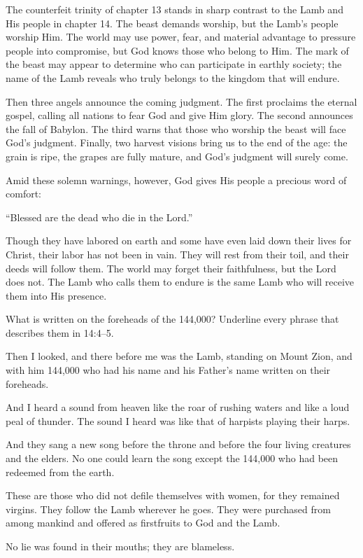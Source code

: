 The counterfeit trinity of chapter 13 stands in sharp contrast to the Lamb and His people in chapter 14. The beast demands worship, but the Lamb's people worship Him. The world may use power, fear, and material advantage to pressure people into compromise, but God knows those who belong to Him. The mark of the beast may appear to determine who can participate in earthly society; the name of the Lamb reveals who truly belongs to the kingdom that will endure.

Then three angels announce the coming judgment. The first proclaims the eternal gospel, calling all nations to fear God and give Him glory. The second announces the fall of Babylon. The third warns that those who worship the beast will face God's judgment. Finally, two harvest visions bring us to the end of the age: the grain is ripe, the grapes are fully mature, and God's judgment will surely come.

Amid these solemn warnings, however, God gives His people a precious word of comfort:

“Blessed are the dead who die in the Lord.”

Though they have labored on earth and some have even laid down their lives for Christ, their labor has not been in vain. They will rest from their toil, and their deeds will follow them. The world may forget their faithfulness, but the Lord does not. The Lamb who calls them to endure is the same Lamb who will receive them into His presence.

\begin{ScriptureBox2}{What is written on the foreheads of the 144,000? Underline every phrase that describes them in 14:4--5.}

\item[14:1] Then I looked, and there before me was the Lamb, standing on Mount Zion, and with him 144,000 who had his name and his Father's name written on their foreheads.

\item[14:2] And I heard a sound from heaven like the roar of rushing waters and like a loud peal of thunder. The sound I heard was like that of harpists playing their harps.

\item[14:3] And they sang a new song before the throne and before the four living creatures and the elders. No one could learn the song except the 144,000 who had been redeemed from the earth.

\item[14:4] These are those who did not defile themselves with women, for they remained virgins. They follow the Lamb wherever he goes. They were purchased from among mankind and offered as firstfruits to God and the Lamb.

\item[14:5] No lie was found in their mouths; they are blameless.

\end{ScriptureBox2}

